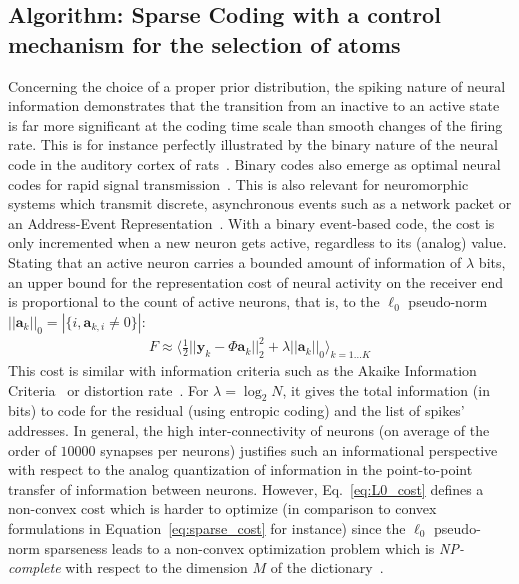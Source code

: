 \documentclass[vision,article,submit,oneauthor,pdftex]{Definitions/mdpi}
\newcommand{\coef}{\mathbf{a}} %
\newcommand{\image}{\mathbf{y}} %
\newcommand{\dico}{\Phi} %
\newcommand{\enscond}[2]{\lbrace #1, #2 \rbrace}
\newcommand{\norm}[1]{|\!| #1 |\!|}
\newcommand{\abs}[1]{\left|#1\right|}
\newcommand{\seeEq}[1]{Eq.~\ref{eq:#1}}%
\begin{document}
\subsection{Algorithm: Sparse Coding with a control mechanism for the selection of atoms}
Concerning the choice of a proper prior distribution, the spiking nature of neural information demonstrates that the transition from an inactive to an active state is far more significant at the coding time scale than smooth changes of the firing rate. This is for instance perfectly illustrated by the binary nature of the neural code in the auditory cortex of rats~\citep{DeWeese03}. Binary codes also emerge as optimal neural codes for rapid signal transmission~\citep{Bethge03}. This is also relevant for neuromorphic systems which transmit discrete, asynchronous events such as a network packet or an Address-Event Representation~\citep{Khoei19}. With a binary event-based code, the cost is only incremented when a new neuron gets active, regardless to its (analog) value. Stating that an active neuron carries a bounded amount of information of $\lambda$ bits, an upper bound for the representation cost of neural activity on the receiver end is proportional to the count of active neurons, that is, to the $\ell_0$ pseudo-norm $\norm{\coef_{k}}_0 = \abs{\enscond{i}{\coef_{k, i} \neq 0}}$:%
\begin{align}%
F \approx   \langle \frac{1}{2} \norm{\image_k - \dico \coef_{k}}_2^2 + \lambda\norm{\coef_{k}}_0 \rangle_{k = 1 \ldots K}%
\label{eq:L0_cost}%
\end{align}%
This cost is similar with information criteria such as the Akaike Information Criteria~\citep{Akaike74} or distortion rate~\cite[p.~571]{Mallat98}. For $\lambda=\log_2 N$, it gives the total information (in bits) to code for the residual (using entropic coding) and the list of spikes' addresses. In general, the high inter-connectivity of neurons (on average of the order of $10000$ synapses per neurons) justifies such an informational perspective with respect to the analog quantization of information in the point-to-point transfer of information between neurons.
However, \seeEq{L0_cost} defines a non-convex cost which is harder to optimize (in comparison to convex formulations in Equation~\ref{eq:sparse_cost} for instance) since the $\ell_0$ pseudo-norm sparseness leads to a non-convex optimization problem which is \emph{NP-complete} with respect to the dimension $M$ of the dictionary~\cite[p.~418]{Mallat98}.
\end{document}
